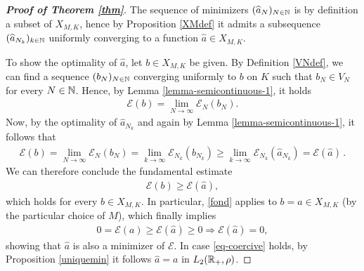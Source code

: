 \begin{proof}[\normalfont\bf Proof of Theorem \ref{thm}]
	The sequence of minimizers $(\widehat a_N)_{N \in \mathbb{N}}$ is by definition a subset of $X_{M,K}$, hence by Proposition \ref{XMdef} it admits a subsequence $(\widehat a_{N_k})_{k \in \mathbb{N}}$ uniformly converging to a function $\widehat a \in X_{M,K}$.
	
	To show the optimality of $\widehat a$, let $b\in X_{M,K}$ be given. By Definition \ref{VNdef}, we can find a sequence $(b_N)_{N \in \mathbb{N}}$ converging uniformly to $b$ on $K$ such that $b_N\in V_N$ for every $N\in \mathbb{N}$. Hence, by Lemma \ref{lemma-semicontinuous-1}, it holds
	\begin{align*}
		\mathcal E(b)=\lim_{N\rightarrow\infty} \mathcal E_{N}(b_{N}).
	\end{align*}
	Now, by the optimality of $\widehat a_{N_k}$ and again by Lemma \ref{lemma-semicontinuous-1}, it follows that
	\begin{align*}
		\mathcal E(b)=\lim_{N\rightarrow\infty}\mathcal E_N(b_N)
			= \lim_{k \rightarrow\infty}\mathcal E_{N_k}(b_{N_k})
			\geq\lim_{k \rightarrow\infty}\mathcal E_{N_k}(\widehat a_{N_k})
			= \mathcal E(\widehat a)\,.
	\end{align*}
	We can therefore conclude the fundamental estimate
	\begin{align}\label{fond}
		\mathcal E(b)\geq \mathcal E(\widehat a),
	\end{align}
	which holds for every $b \in X_{M,K}$. In particular, \eqref{fond} applies to $b=a\in X_{M,K}$ (by the particular choice of $M$), which finally implies
	\begin{align*}
		0=\mathcal E(a)\geq \mathcal E(\widehat a)\geq 0\Longrightarrow \mathcal  E(\widehat a)=0,
	\end{align*}
	showing that $\widehat a$ is also a minimizer of $\mathcal E$. In case \eqref{eq-coercive} holds, by Proposition \ref{uniquemin} it follows $\widehat a=a$ in  $L_2(\mathbb{R}_+,\rho)$.
\end{proof}